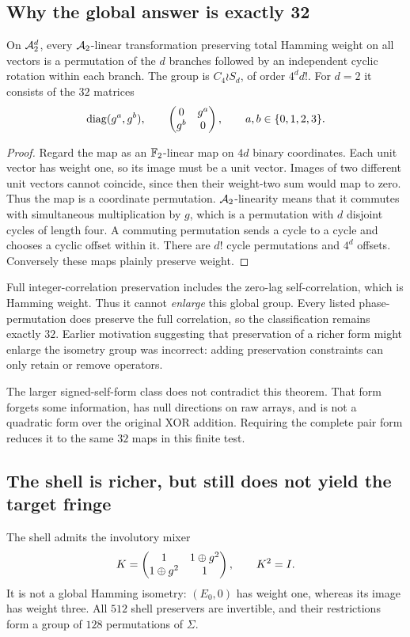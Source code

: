 \subsection{Why the global answer is exactly 32}
\begin{theorem}\label{thm:hamming}
On $\mathcal A_2^d$, every $\mathcal A_2$-linear transformation preserving total Hamming weight on all vectors is a permutation of the $d$ branches followed by an independent cyclic rotation within each branch. The group is $C_4\wr S_d$, of order $4^d d!$. For $d=2$ it consists of the $32$ matrices
\begin{equation}
 \operatorname{diag}(g^a,g^b),\qquad \begin{pmatrix}0&g^a\\g^b&0\end{pmatrix},\qquad a,b\in\{0,1,2,3\}.
\end{equation}
\end{theorem}
\begin{proof}
Regard the map as an $\mathbb F_2$-linear map on $4d$ binary coordinates. Each unit vector has weight one, so its image must be a unit vector. Images of two different unit vectors cannot coincide, since then their weight-two sum would map to zero. Thus the map is a coordinate permutation. $\mathcal A_2$-linearity means that it commutes with simultaneous multiplication by $g$, which is a permutation with $d$ disjoint cycles of length four. A commuting permutation sends a cycle to a cycle and chooses a cyclic offset within it. There are $d!$ cycle permutations and $4^d$ offsets. Conversely these maps plainly preserve weight.
\end{proof}
Full integer-correlation preservation includes the zero-lag self-correlation, which is Hamming weight. Thus it cannot \emph{enlarge} this global group. Every listed phase-permutation does preserve the full correlation, so the classification remains exactly $32$. Earlier motivation suggesting that preservation of a richer form might enlarge the isometry group was incorrect: adding preservation constraints can only retain or remove operators.

The larger signed-self-form class does not contradict this theorem. That form forgets some information, has null directions on raw arrays, and is not a quadratic form over the original XOR addition. Requiring the complete pair form reduces it to the same $32$ maps in this finite test.

\subsection{The shell is richer, but still does not yield the target fringe}
The shell admits the involutory mixer
\begin{equation}
 K=\begin{pmatrix}1&1\oplus g^2\\1\oplus g^2&1\end{pmatrix},\qquad K^2=I.
\end{equation}
It is not a global Hamming isometry: $(E_0,0)$ has weight one, whereas its image has weight three. All $512$ shell preservers are invertible, and their restrictions form a group of $128$ permutations of $\Sigma$.

